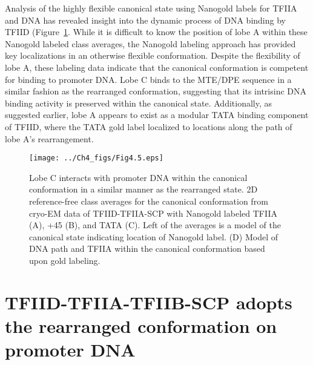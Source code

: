 \indent Analysis of the highly flexible canonical state using Nanogold labels for TFIIA and DNA has revealed insight into the dynamic process of DNA binding by TFIID (Figure~\ref{fig:Fig4.5}.  While it is difficult to know the position of lobe A within these Nanogold labeled class averages, the Nanogold labeling approach has provided key localizations in an otherwise flexible conformation. Despite the flexibility of lobe A, these labeling data indicate that the canonical conformation is competent for binding to promoter DNA. Lobe C binds to the MTE/DPE sequence in a similar fashion as the rearranged conformation, suggesting that its intrisinc DNA binding activity is preserved within the canonical state. Additionally, as suggested earlier, lobe A appears to exist as a modular TATA binding component of TFIID, where the TATA gold label localized to locations along the path of lobe A's rearrangement.\\ 
\begin{figure}
\centering
\texttt{[image: ../Ch4\_figs/Fig4.5.eps]}
\caption[Lobe C interacts with promoter DNA within the canonical conformation in a similar manner as the rearranged state]{Lobe C interacts with promoter DNA within the canonical conformation in a similar manner as the rearranged state. 2D reference-free class averages for the canonical conformation from cryo-EM data of TFIID-TFIIA-SCP with Nanogold labeled TFIIA (A), +45 (B), and TATA (C). Left of the averages is a model of the canonical state indicating location of Nanogold label. (D) Model of DNA path and TFIIA within the canonical conformation based upon gold labeling.}
\label{fig:Fig4.5}
\end{figure}

\section{TFIID-TFIIA-TFIIB-SCP adopts the rearranged conformation on promoter DNA}

